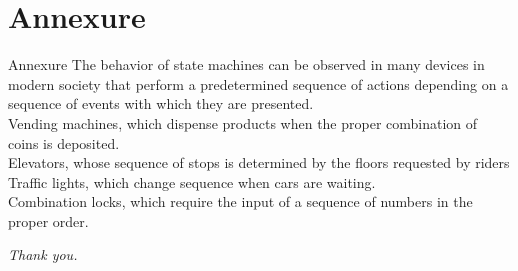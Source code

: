 \documentclass{beamer}
\begin{document}
\section{Annexure}

\begin{frame}{Annexure}
    The behavior of state machines can be observed in many devices in modern society that perform a predetermined sequence of actions depending on a sequence of events with which they are presented. \\
    Vending machines, which dispense products when the proper combination of coins is deposited.\\
    Elevators, whose sequence of stops is determined by the floors requested by riders \\
    Traffic lights, which change sequence when cars are waiting. \\
    Combination locks, which require the input of a sequence of numbers in the proper order.
    
\end{frame}

\begin{frame}
    \centering
    \textit{Thank you.}
\end{frame}
\end{document}

